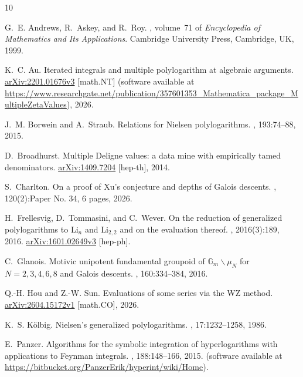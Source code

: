 \documentclass[final,notitlepage,12pt,reqno]{amsart}
\theoremstyle{plain}
\theoremstyle{definition}
\numberwithin{equation}{section}
\begin{document}
\begin{thebibliography}{10}

G.~E. Andrews, R.~Askey, and R.~Roy.
, volume~71 of {\em Encyclopedia of
  Mathematics and Its Applications}.
\newblock Cambridge University Press, Cambridge, UK, 1999.

K.~C. Au.
\newblock Iterated integrals and multiple polylogarithm at algebraic arguments.
\newblock \url{arXiv:2201.01676v3} [math.NT] (software available at
  \url{https://www.researchgate.net/publication/357601353_Mathematica_package_MultipleZetaValues}),
  2026.

J.~M. Borwein and A.~Straub.
\newblock Relations for {N}ielsen polylogarithms.
, 193:74--88, 2015.

D.~Broadhurst.
\newblock Multiple {D}eligne values: a data mine with empirically tamed
  denominators.
\newblock \url{arXiv:1409.7204} [hep-th], 2014.

S.~Charlton.
\newblock On a proof of {X}u's conjecture and depths of {G}alois descents.
,
  120(2):Paper No. 34, 6 pages, 2026.

H.~Frellesvig, D.~Tommasini, and C.~Wever.
\newblock On the reduction of generalized polylogarithms to $\mathrm{Li}_ n$
  and $\mathrm{Li}_{2, 2}$ and on the evaluation thereof.
, 2016(3):189, 2016.
\newblock \url{arXiv:1601.02649v3} [hep-ph].

C.~Glanois.
\newblock Motivic unipotent fundamental groupoid of
  {$\mathbb{G}_m\smallsetminus\mu_N$} for {$N=2,3,4,6,8$} and {G}alois
  descents.
, 160:334--384, 2016.

Q.-H. Hou and Z.-W. Sun.
\newblock Evaluations of some series via the WZ method.
\newblock \url{arXiv:2604.15172v1} [math.CO], 2026.

K.~S. K{\"o}lbig.
\newblock Nielsen's generalized polylogarithms.
, 17:1232--1258, 1986.

E.~Panzer.
\newblock Algorithms for the symbolic integration of hyperlogarithms with
  applications to {F}eynman integrals.
, 188:148--166, 2015.
\newblock (software available at
  \url{https://bitbucket.org/PanzerErik/hyperint/wiki/Home}).


\end{thebibliography}
\end{document}
